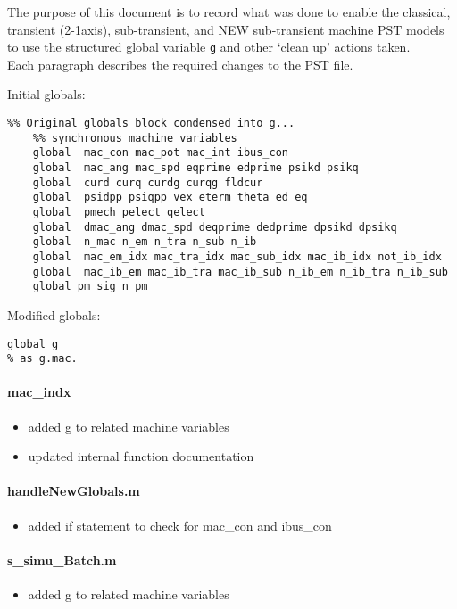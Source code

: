 \documentclass[12pt]{article}
\begin{document}
The purpose of this document is to record what was done to enable the classical, transient (2-1axis), sub-transient, and NEW sub-transient machine PST models to use the structured global variable \verb|g| and other `clean up' actions taken. \\
Each paragraph describes the required changes to the PST file.

Initial globals:
\begin{verbatim}
%% Original globals block condensed into g...
    %% synchronous machine variables  
    global  mac_con mac_pot mac_int ibus_con
    global  mac_ang mac_spd eqprime edprime psikd psikq
    global  curd curq curdg curqg fldcur
    global  psidpp psiqpp vex eterm theta ed eq
    global  pmech pelect qelect
    global  dmac_ang dmac_spd deqprime dedprime dpsikd dpsikq
    global  n_mac n_em n_tra n_sub n_ib
    global  mac_em_idx mac_tra_idx mac_sub_idx mac_ib_idx not_ib_idx
    global  mac_ib_em mac_ib_tra mac_ib_sub n_ib_em n_ib_tra n_ib_sub
    global pm_sig n_pm 
\end{verbatim}

Modified globals:
\begin{verbatim}
global g
% as g.mac.
\end{verbatim}

\paragraph{mac\_indx}
	\begin{itemize}
		\item added g to related machine variables
		\item updated internal function documentation
	\end{itemize}

\paragraph{handleNewGlobals.m}
	\begin{itemize}
		\item added if statement to check for mac\_con and ibus\_con
	\end{itemize}

\paragraph{s\_simu\_Batch.m}
	\begin{itemize}
		\item  added g to related machine variables
	\end{itemize}
\end{document}
